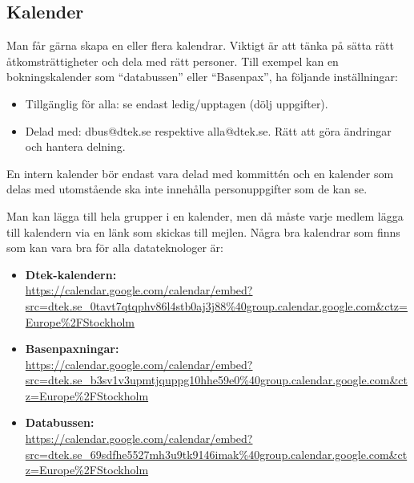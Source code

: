 


\subsection{Kalender}

Man får gärna skapa en eller flera kalendrar. Viktigt är att tänka på sätta rätt åtkomsträttigheter och dela med rätt personer. Till exempel kan en bokningskalender som ``databussen'' eller ``Basenpax'', ha följande inställningar:
\begin{itemize}
    \item Tillgänglig för alla: se endast ledig/upptagen (dölj uppgifter).
    \item Delad med: dbus@dtek.se respektive alla@dtek.se. Rätt att göra ändringar och hantera delning.
\end{itemize}

En intern kalender bör endast vara delad med kommittén och en kalender som delas med utomstående ska inte innehålla personuppgifter som de kan se. 

Man kan lägga till hela grupper i en kalender, men då måste varje medlem lägga till kalendern via en länk som skickas till mejlen. Några bra kalendrar som finns som kan vara bra för alla datateknologer är:

\begin{itemize}
    \item \textbf{Dtek-kalendern:} \\
    \url{https://calendar.google.com/calendar/embed?src=dtek.se_0tavt7qtqphv86l4stb0aj3j88\%40group.calendar.google.com&ctz=Europe\%2FStockholm}
    \item \textbf{Basenpaxningar:} \\
    \url{https://calendar.google.com/calendar/embed?src=dtek.se_b3sv1v3upmtjquppg10hhe59e0\%40group.calendar.google.com&ctz=Europe\%2FStockholm}
    \item \textbf{Databussen:} \\
    \url{https://calendar.google.com/calendar/embed?src=dtek.se_69sdfhe5527mh3u9tk9146imak\%40group.calendar.google.com\&ctz=Europe\%2FStockholm}
\end{itemize}

